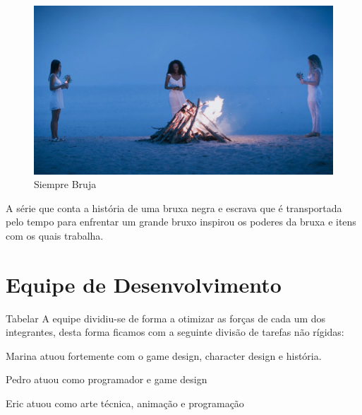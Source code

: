 \begin{figure}[htb]
	\caption{\label{siempre}Siempre Bruja}
	\begin{center}
	    \includegraphics[width=\textwidth]{imagens/SiempreBruja.jpg}
	\end{center}
\end{figure}

A série que conta a história de uma bruxa negra e escrava que é transportada  pelo tempo para enfrentar um grande bruxo inspirou os poderes da bruxa e itens com os quais trabalha. 

\vfill
\pagebreak

\section{Equipe de Desenvolvimento}
Tabelar
A equipe dividiu-se de forma a otimizar as forças de cada um dos integrantes, desta forma ficamos com a seguinte divisão de tarefas não rígidas:

Marina atuou fortemente com o game design, character design e história. 

Pedro atuou como programador e game design

Eric atuou como arte técnica, animação e programação